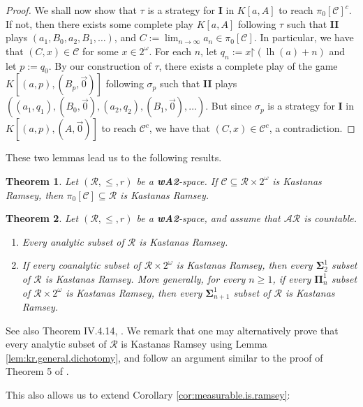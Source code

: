 \documentclass[11pt,reqno]{amsart}
\theoremstyle{plain}
\numberwithin{equation}{section}
\newtheorem{theorem}{Theorem}[section]
\theoremstyle{definition}
\newcommand{\func}{\operatorname}
\newcommand{\cal}{\mathcal}
\newcommand{\restrictedto}{\mathord{\upharpoonright}}
\newcommand{\lh}{\func{lh}}
\begin{document}
\begin{proof}
    We shall now show that $\tau$ is a strategy for \textbf{I} in $K[a,A]$ to reach $\pi_0[\cal{C}]^c$. If not, then there exists some complete play $K[a,A]$ following $\tau$ such that \textbf{II} plays $(a_1,B_0,a_2,B_1,\dots)$, and $C := \lim_{n\to\infty} a_n \in \pi_0[\cal{C}]$. In particular, we have that $(C,x) \in \cal{C}$ for some $x \in 2^\omega$. For each $n$, let $q_n := x\restrictedto(\lh(a)+n)$ and let $p := q_0$. By our construction of $\tau$, there exists a complete play of the game $K[(a,p),(B_p,\vec{0})]$ following $\sigma_p$ such that \textbf{II} plays $((a_1,q_1),(B_0,\vec{0}),(a_2,q_2),(B_1,\vec{0}),\dots)$. But since $\sigma_p$ is a strategy for \textbf{I} in $K[(a,p),(A,\vec{0})]$ to reach $\cal{C}^c$, we have that $(C,x) \in \cal{C}^c$, a contradiction.
\end{proof}

These two lemmas lead us to the following results.

\begin{theorem}
    Let $(\cal{R},\leq,r)$ be a \textbf{wA2}-space. If $\cal{C} \subseteq \cal{R} \times 2^\omega$ is Kastanas Ramsey, then $\pi_0[\cal{C}] \subseteq \cal{R}$ is Kastanas Ramsey.
\end{theorem}

\begin{theorem}
\label{thm:kr.and.projection}
    Let $(\cal{R},\leq,r)$ be a \textbf{wA2}-space, and assume that $\cal{AR}$ is countable. 
    \begin{enumerate}
        \item Every analytic subset of $\cal{R}$ is Kastanas Ramsey.

        \item If every coanalytic subset of $\cal{R} \times 2^\omega$ is Kastanas Ramsey, then every $\mathbf{\Sigma}_2^1$ subset of $\cal{R}$ is Kastanas Ramsey. More generally, for every $n \geq 1$, if every $\mathbf{\Pi}_n^1$ subset of $\cal{R} \times 2^\omega$ is Kastanas Ramsey, then every $\mathbf{\Sigma}_{n+1}^1$ subset of $\cal{R}$ is Kastanas Ramsey.
    \end{enumerate}
\end{theorem}

See also Theorem IV.4.14, \cite{AT05}. We remark that one may alternatively prove that every analytic subset of $\cal{R}$ is Kastanas Ramsey using Lemma \ref{lem:kr.general.dichotomy}, and follow an argument similar to the proof of Theorem 5 of \cite{R08}.

This also allows us to extend Corollary \ref{cor:measurable.is.ramsey}:
\end{document}
